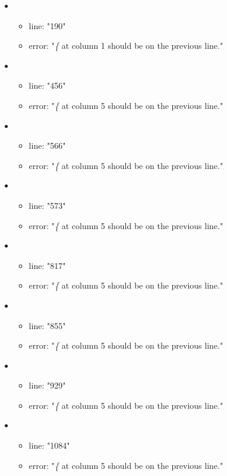 \begin{itemize}
	\item 
	\begin{itemize} 
		\item line: "190" 
		\item error: "\emph{\{} at column 1 should be on the previous line." 
	\end{itemize}
	\item 
	\begin{itemize} 
		\item line: "456" 
		\item error: "\emph{\{} at column 5 should be on the previous line." 
	\end{itemize}
	\item 
	\begin{itemize} 
		\item line: "566" 
		\item error: "\emph{\{} at column 5 should be on the previous line." 
	\end{itemize}
	\item 
	\begin{itemize} 
		\item line: "573" 
		\item error: "\emph{\{} at column 5 should be on the previous line." 
	\end{itemize}
	\item 
	\begin{itemize} 
		\item line: "817" 
		\item error: "\emph{\{} at column 5 should be on the previous line." 
	\end{itemize}
	\item 
	\begin{itemize} 
		\item line: "855" 
		\item error: "\emph{\{} at column 5 should be on the previous line." 
	\end{itemize}
	\item 
	\begin{itemize} 
		\item line: "929" 
		\item error: "\emph{\{} at column 5 should be on the previous line." 
	\end{itemize}
	\item 
	\begin{itemize} 
		\item line: "1084" 
		\item error: "\emph{\{} at column 5 should be on the previous line." 

\end{itemize}
\end{itemize}
